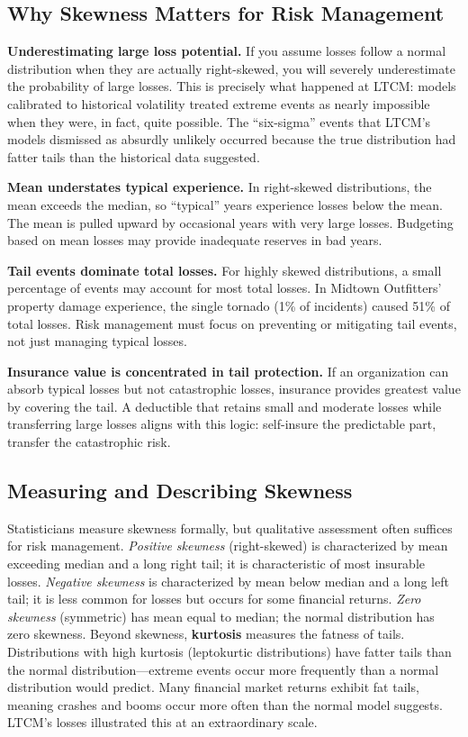 \documentclass[11pt,openany]{book}
\begin{document}
\subsection{Why Skewness Matters for Risk Management}
\label{subsec:skewness-matters}

\textbf{Underestimating large loss potential.} If you assume losses follow a
normal distribution when they are actually right-skewed, you will severely
underestimate the probability of large losses. This is precisely what happened
at LTCM: models calibrated to historical volatility treated extreme events as
nearly impossible when they were, in fact, quite possible. The ``six-sigma''
events that LTCM's models dismissed as absurdly unlikely occurred because the
true distribution had fatter tails than the historical data suggested.

\textbf{Mean understates typical experience.} In right-skewed distributions,
the mean exceeds the median, so ``typical'' years experience losses below the
mean. The mean is pulled upward by occasional years with very large losses.
Budgeting based on mean losses may provide inadequate reserves in bad years.

\textbf{Tail events dominate total losses.} For highly skewed distributions, a
small percentage of events may account for most total losses. In Midtown
Outfitters' property damage experience, the single tornado (1\% of incidents)
caused 51\% of total losses. Risk management must focus on preventing or
mitigating tail events, not just managing typical losses.

\textbf{Insurance value is concentrated in tail protection.} If an organization
can absorb typical losses but not catastrophic losses, insurance provides
greatest value by covering the tail. A deductible that retains small and
moderate losses while transferring large losses aligns with this logic:
self-insure the predictable part, transfer the catastrophic risk.

\subsection{Measuring and Describing Skewness}
\label{subsec:measuring-skewness}

Statisticians measure skewness formally, but qualitative assessment often
suffices for risk management. \emph{Positive skewness} (right-skewed) is
characterized by mean exceeding median and a long right tail; it is
characteristic of most insurable losses. \emph{Negative skewness} is
characterized by mean below median and a long left tail; it is less common for
losses but occurs for some financial returns. \emph{Zero skewness} (symmetric)
has mean equal to median; the normal distribution has zero skewness. Beyond
skewness, \textbf{kurtosis} measures the fatness of tails. Distributions with
high kurtosis (leptokurtic distributions) have fatter tails than the normal
distribution---extreme events occur more frequently than a normal distribution
would predict. Many financial market returns exhibit fat tails, meaning crashes
and booms occur more often than the normal model suggests. LTCM's losses
illustrated this at an extraordinary scale.
\end{document}
